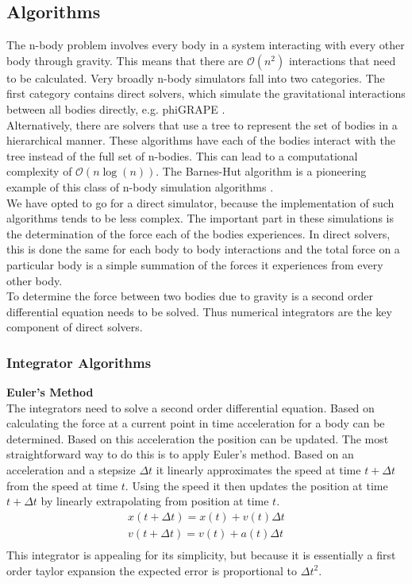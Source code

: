 \documentclass[11pt]{article} %
\begin{document}
\subsection{Algorithms}
The n-body problem involves every body in a system interacting with every other body through gravity. This means that there are $\mathcal{O}(n^2)$ interactions that need to be calculated. Very broadly n-body simulators fall into two categories. The first category contains direct solvers, which simulate the gravitational interactions between all bodies directly, e.g. phiGRAPE \cite{Harfst2007357}. \\
Alternatively, there are solvers that use a tree to represent the set of bodies in a hierarchical manner. These algorithms have each of the bodies interact with the tree instead of the full set of n-bodies. This can lead to a computational complexity of $\mathcal{O}(n \log(n))$. The Barnes-Hut algorithm is a pioneering example of this class of n-body simulation algorithms \cite{barnes1986hierarchical}.\\
We have opted to go for a direct simulator, because the implementation of such algorithms tends to be less complex. The important part in these simulations is the determination of the force each of the bodies experiences. In direct solvers, this is done the same for each body to body interactions and the total force on a particular body is a simple summation of the forces it experiences from every other body. \\
To determine the force between two bodies due to gravity is a second order differential equation needs to be solved. Thus numerical integrators are the key component of direct solvers.
\subsubsection{Integrator Algorithms}
\textbf{Euler's Method}\\
The integrators need to solve a second order differential equation. Based on calculating the force at a current point in time acceleration for a body can be determined. Based on this acceleration the position can be updated. The most straightforward way to do this is to apply Euler's method. Based on an acceleration and a stepsize $\Delta t$ it linearly approximates the speed at time $t + \Delta t$ from the speed at time $t$. Using the speed it then updates the position at time $t+\Delta t$ by linearly extrapolating from position at time $t$.
\begin{equation}
    \begin{split}
    x(t+ \Delta t) = x(t) + v(t) \Delta t \\
    v(t+ \Delta t) = v(t) + a(t) \Delta t \\
    \end{split}
\end{equation}
This integrator is appealing for its simplicity, but because it is essentially a first order taylor expansion the expected error is proportional to $\Delta t^2$.
\end{document}
